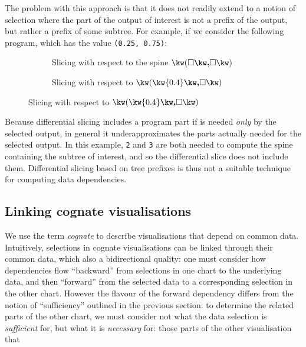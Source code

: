 The problem with this approach is that it does not readily extend to a notion of selection where the part of the output of interest is not a prefix of the output, but rather a prefix of some subtree. For example, if we consider the following program, which has the value \lstinline{(0.25, 0.75)}:

\begin{figure}[H]
   \small
   \begin{subfigure}{0.45\textwidth}
      {}
   \caption{Slicing with respect to the spine $\exPair{\hole}{\hole}$}
   \end{subfigure}
   \begin{subfigure}{0.45\textwidth}
      {}
   \caption{Slicing with respect to $\exPair{\kw{0.4}}{\hole}$}
   \end{subfigure}
\end{figure}

\noindent Because differential slicing includes a program part if is needed \emph{only} by the selected output, in general it underapproximates the parts actually needed for the selected output. In this example, \lstinline{2} and \lstinline{3} are both needed to compute the spine containing the subtree of interest, and so the differential slice does not include them. Differential slicing based on tree prefixes is thus not a suitable technique for computing data dependencies.

\subsection{Linking cognate visualisations}

We use the term \emph{cognate} to describe visualisations that depend on common data. Intuitively, selections in cognate visualisations can be linked through their common data, which also a bidirectional quality: one must consider how dependencies flow ``backward'' from selections in one chart to the underlying data, and then ``forward'' from the selected data to a corresponding selection in the other chart. However the flavour of the forward dependency differs from the notion of ``sufficiency'' outlined in the previous section: to determine the related parts of the other chart, we must consider not what the data selection is \emph{sufficient} for, but what it is \emph{necessary} for: those parts of the other visualisation that



